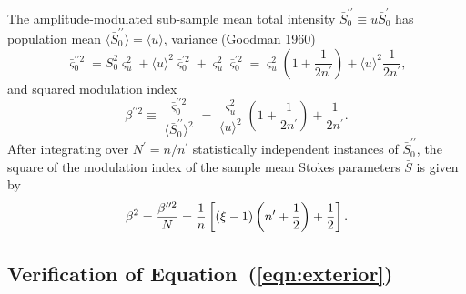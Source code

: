 \documentclass[twocolumn]{aastex6}
\newcommand{\Eqn}[1]{Equation~(\ref{eqn:#1})}
\begin{document}
{\begin{appendix}
The amplitude-modulated sub-sample mean total intensity
$\bar{S}_0^{\prime\prime} \equiv u\bar{S}_0^\prime$ has population
mean
%
$\langle\bar{S}_0^{\prime\prime}\rangle=\langle u\rangle$,
%
variance (Goodman 1960)
%
\begin{equation}
  \bar{\varsigma}_0^{\prime\prime2}
  = S_0^2\varsigma_u^2 + \langle u\rangle^2 \bar{\varsigma}_0^{\prime2}
  + \varsigma_u^2 \bar{\varsigma}_0^{\prime2}
  = \varsigma_u^2 \left(1+\frac{1}{2n^\prime}\right)
  + \langle u\rangle^2\frac{1}{2n^\prime},
\end{equation}
%
and squared modulation index
%
\begin{equation}
  \beta^{\prime\prime2}\equiv\frac{\bar{\varsigma}_0^{\prime\prime2}}{\langle \bar{S}_0^{\prime\prime}\rangle^2}
  = \frac{\varsigma_u^2}{\langle u\rangle^2}\left(1+\frac{1}{2n^\prime}\right)
  +\frac{1}{2n^\prime}.
\end{equation}
%
After integrating over $N^\prime=n/n^\prime$ statistically independent
instances of $\bar{S}_0^{\prime\prime}$, the square of the modulation
index of the sample mean Stokes parameters $\bar{S}$ is given by
%
\begin{equation}
  \beta^2 = \frac{\beta^{\prime\prime2}}{N} = {1\over n}\left[\left(\xi-1\right)
                    \left(n^\prime+\frac{1}{2}\right)
                    +\frac{1}{2}\right].
\end{equation}


%
%
%
\hrulefill
\subsection{Verification of \Eqn{exterior}}


\end{appendix}}
\end{document}
